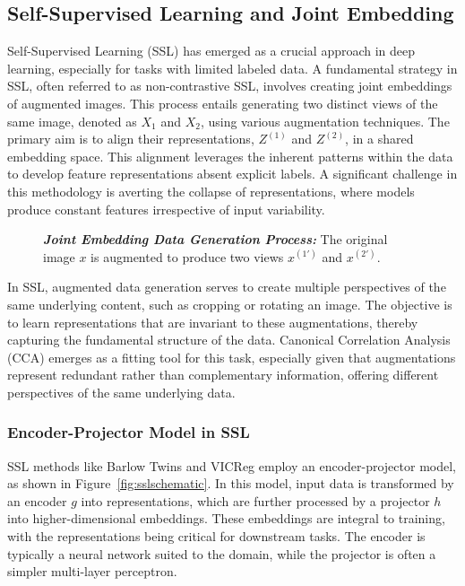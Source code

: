 \subsection{Self-Supervised Learning and Joint Embedding}

Self-Supervised Learning (SSL) has emerged as a crucial approach in deep learning, especially for tasks with limited labeled data. A fundamental strategy in SSL, often referred to as non-contrastive SSL, involves creating joint embeddings of augmented images. This process entails generating two distinct views of the same image, denoted as \( X_1 \) and \( X_2 \), using various augmentation techniques. The primary aim is to align their representations, \( Z^{(1)} \) and \( Z^{(2)} \), in a shared embedding space. This alignment leverages the inherent patterns within the data to develop feature representations absent explicit labels. A significant challenge in this methodology is averting the collapse of representations, where models produce constant features irrespective of input variability.

\begin{figure}[ht]
    \centering
    \caption[Joint Embedding Data Generation Process]{\textit{\textbf{Joint Embedding Data Generation Process:}} The original image \(x\) is augmented to produce two views \(x^{(1')}\) and \(x^{(2')}\).}
    \label{fig:joint-embedding}
\end{figure}

In SSL, augmented data generation serves to create multiple perspectives of the same underlying content, such as cropping or rotating an image. The objective is to learn representations that are invariant to these augmentations, thereby capturing the fundamental structure of the data. Canonical Correlation Analysis (CCA) emerges as a fitting tool for this task, especially given that augmentations represent redundant rather than complementary information, offering different perspectives of the same underlying data.

\subsubsection{Encoder-Projector Model in SSL}
SSL methods like Barlow Twins and VICReg employ an encoder-projector model, as shown in Figure~\ref{fig:sslschematic}. In this model, input data is transformed by an encoder \( g \) into representations, which are further processed by a projector \( h \) into higher-dimensional embeddings. These embeddings are integral to training, with the representations being critical for downstream tasks. The encoder is typically a neural network suited to the domain, while the projector is often a simpler multi-layer perceptron.

